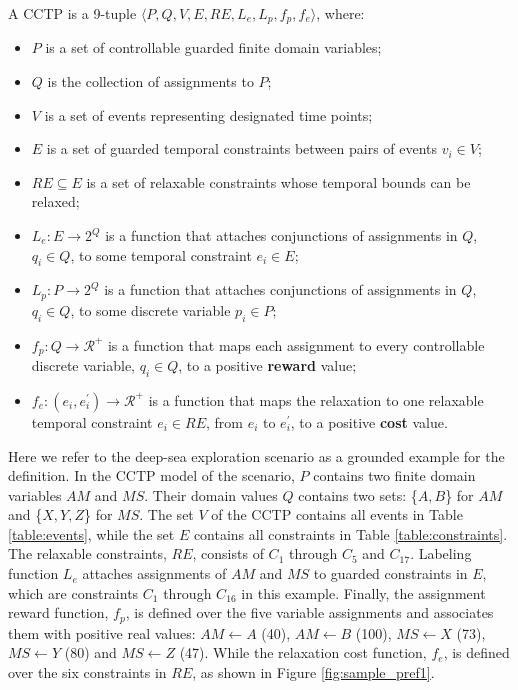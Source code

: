 \documentclass[jair,twoside,11pt,theapa]{article}
\begin{document}
\begin{mydef}
	A CCTP is a 9-tuple $\langle P, Q, V, E, RE, L_e, L_p, f_p, f_e\rangle$, where:
	\begin{itemize}
		
		\item $P$ is a set of controllable guarded finite domain variables;
		\item $Q$ is the collection of assignments to $P$;
		\item $V$ is a set of events representing designated time points;
		\item $E$ is a set of guarded temporal constraints between pairs of events $v_i\in V$;
		\item $RE \subseteq E$ is a set of relaxable constraints whose temporal bounds can be
		relaxed;
		\item $L_e:E \rightarrow 2^Q$ is a function that attaches conjunctions of
		assignments in $Q$, $q_i\in Q$, to some temporal constraint $e_i\in E$;
		\item $L_p:P \rightarrow 2^Q$ is a function that attaches conjunctions of
		assignments in $Q$, $q_i\in Q$, to some discrete variable $p_i\in P$;
		\item $f_p:Q\rightarrow \mathcal{R}^{+}$ is a function that maps each
		assignment to every controllable discrete variable, $q_i\in Q$, to a
		positive \textbf{reward} value;
		\item $f_e:(e_i,e_i^{\prime})\rightarrow \mathcal{R}^{+}$ is a function
		that maps the relaxation to one relaxable temporal constraint $e_i\in RE$,
		from
		$e_i$ to $e_i^{\prime}$, to a positive \textbf{cost} value.
	\end{itemize}
\end{mydef}

%
%
%
%

Here we refer to the deep-sea exploration scenario as a grounded
example for the definition. In the CCTP model of the scenario, $P$ contains two
finite domain variables $AM$ and $MS$. Their domain values $Q$ contains two
sets: \{$A,B$\} for $AM$ and \{$X,Y,Z$\} for $MS$. The set $V$ of the CCTP
contains all events in Table \ref{table:events}, while the set $E$ contains all
constraints in Table \ref{table:constraints}. The relaxable constraints, $RE$,
consists of $C_1$ through $C_5$ and $C_{17}$. Labeling function $L_e$ attaches
assignments of $AM$ and $MS$ to guarded constraints in $E$, which are
constraints $C_1$ through $C_{16}$ in this example. Finally, the assignment reward
function, $f_p$, is defined over the five variable assignments and associates
them with positive real values: $AM\leftarrow A$ (40), $AM\leftarrow B$ (100),
$MS\leftarrow X$ (73), $MS\leftarrow Y$ (80) and $MS\leftarrow Z$ (47). While
the relaxation cost function, $f_e$, is defined over the six constraints in
$RE$, as shown in Figure \ref{fig:sample_pref1}.
\end{document}
